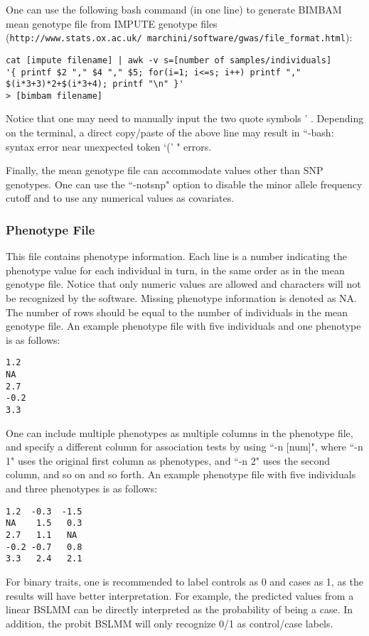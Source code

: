 \documentclass[11pt]{article}
\providecommand{\url}[1]{\texttt{#1}}
\begin{document}
One can use the following bash command (in one line) to generate BIMBAM mean genotype file from IMPUTE genotype files (\url{http://www.stats.ox.ac.uk/~marchini/software/gwas/file_format.html})\cite{Howie:2009}:
%
\begin{verbatim}
cat [impute filename] | awk -v s=[number of samples/individuals] 
'{ printf $2 "," $4 "," $5; for(i=1; i<=s; i++) printf "," $(i*3+3)*2+$(i*3+4); printf "\n" }'
> [bimbam filename]
\end{verbatim}
%
Notice that one may need to manually input the two quote symbols ' . Depending on the terminal, a direct copy/paste of the above line may result in ``-bash: syntax error near unexpected token `(' " errors.

Finally, the mean genotype file can accommodate values other than SNP genotypes. One can use the ``-notsnp" option to disable the minor allele frequency cutoff and to use any numerical values as covariates.


\subsubsection{Phenotype File}
This file contains phenotype information. Each line is a number indicating the phenotype value for each individual in turn, in the same order as in the mean genotype file. Notice that only numeric values are allowed and characters will not be recognized by the software. Missing phenotype information is denoted as NA. The number of rows should be equal to the number of individuals in the mean genotype file. An example phenotype file with five individuals and one phenotype is as follows:
%
\begin{verbatim}
1.2
NA
2.7
-0.2
3.3
\end{verbatim}
%
One can include multiple phenotypes as multiple columns in the phenotype file, and specify a different column for association tests by using ``-n [num]", where ``-n 1" uses the original first column as phenotypes, and ``-n 2" uses the second column, and so on and so forth. An example phenotype file with five individuals and three phenotypes is as follows:
%
\begin{verbatim}
1.2  -0.3  -1.5
NA    1.5   0.3
2.7   1.1   NA
-0.2 -0.7   0.8
3.3   2.4   2.1
\end{verbatim}
%
For binary traits, one is recommended to label controls as 0 and cases as 1, as the results will have better interpretation. For example, the predicted values from a linear BSLMM can be directly interpreted as the probability of being a case. In addition, the probit BSLMM will only recognize 0/1 as control/case labels.
\end{document}
